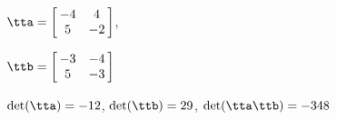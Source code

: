 {$\tta = \left[\hskip -3pt \begin{array}{cc} -4&4\\  5&-2\end {array} \hskip -3pt
 \right]$, 

$\ttb = \left[\hskip -3pt \begin{array}{cc} -3&-4\\  5&-3\end {array} \hskip -3pt
 \right]$}
{$\det(\tta)=-12$, $\det(\ttb)=29$, $\det(\tta\ttb)=-348$}






  

